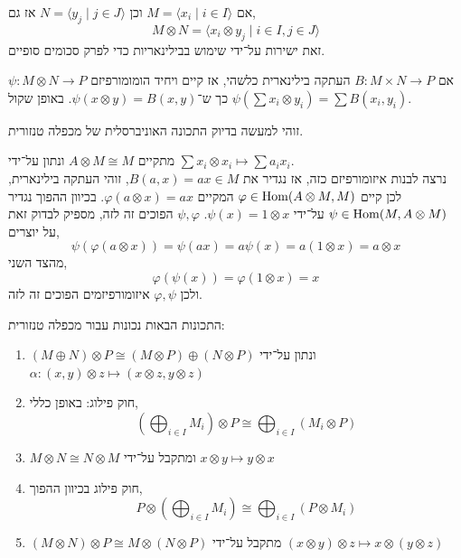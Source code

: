 \begin{remark}
	אם $M = \langle x_i \mid i \in I \rangle$ וכן $N = \langle y_j \mid j \in J \rangle$ אז גם,
	\[
		M \otimes N
		= \langle x_i \otimes y_j \mid i \in I, j \in J \rangle
	\]
	זאת ישירות על־ידי שימוש בבילינאריות כדי לפרק סכומים סופיים.
\end{remark}
\begin{remark}
	אם $B : M \times N \to P$ העתקה בילינארית כלשהי, אז קיים ויחיד הומומורפיזם $\psi : M \otimes N \to P$ כך ש־$\psi(x \otimes y) = B(x, y)$.
	באופן שקול $\psi(\sum x_i \otimes y_i) = \sum B(x_i, y_i)$.
\end{remark}
זוהי למעשה בדיוק התכונה האוניברסלית של מכפלה טנזורית.
\begin{example}
	מתקיים $A \otimes M \cong M$ ונתון על־ידי $\sum x_i \otimes x_i \mapsto \sum a_i x_i$. \\
	נרצה לבנות איזומורפיזם כזה, אז נגדיר את $B(a, x) = a x \in M$, זוהי העתקה בילינארית, לכן קיים $\varphi \in \operatorname{Hom}(A \otimes M, M)$ המקיים $\varphi(a \otimes x) = a x$.
	בכיוון ההפוך נגדיר $\psi \in \operatorname{Hom}(M, A \otimes M)$ על־ידי $\psi(x) = 1 \otimes x$.
	$\psi, \varphi$ הפוכים זה לזה, מספיק לבדוק זאת על יוצרים,
	\[
		\psi(\varphi(a \otimes x))
		= \psi(a x)
		= a \psi(x)
		= a (1 \otimes x)
		= a \otimes x
	\]
	מהצד השני,
	\[
		\varphi(\psi(x))
		= \varphi(1 \otimes x)
		= x
	\]
	ולכן $\varphi, \psi$ איזומורפיזמים הפוכים זה לזה.
\end{example}
\begin{proposition}
	התכונות הבאות נכונות עבור מכפלה טנזורית:
	\begin{enumerate}
		\item $(M \oplus N) \otimes P \cong (M \otimes P) \oplus (N \otimes P)$ ונתון על־ידי $\alpha : (x, y) \otimes z \mapsto (x \otimes z, y \otimes z)$
		\item חוק פילוג: באופן כללי,
			\[
				\left(\bigoplus_{i \in I} M_i\right) \otimes P
				\cong \bigoplus_{i \in I} (M_i \otimes P)
			\]
		\item $M \otimes N \cong N \otimes M$ ומתקבל על־ידי $x \otimes y \mapsto y \otimes x$
		\item חוק פילוג בכיוון ההפוך,
			\[
				P \otimes \left(\bigoplus_{i \in I} M_i\right)
				\cong \bigoplus_{i \in I} (P \otimes M_i)
			\]
		\item $(M \otimes N) \otimes P \cong M \otimes (N \otimes P)$ מתקבל על־ידי $(x \otimes y) \otimes z \mapsto x \otimes (y \otimes z)$
	\end{enumerate}
\end{proposition}
